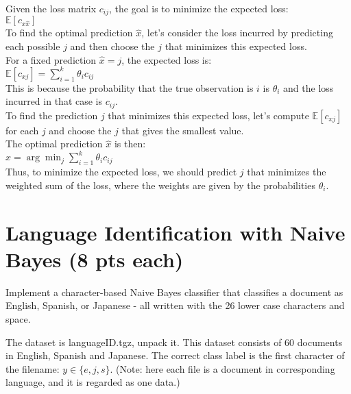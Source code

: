 \documentclass[a4paper]{article}
\theoremstyle{definition}
\newenvironment{soln}{
    \leavevmode\color{blue}\ignorespaces
}{}
\begin{document}
\begin{soln}

Given the loss matrix $c_{ij}$, the goal is to minimize the expected loss:\\

$\mathbb{E}[c_{x\hat{x}}]$\\

To find the optimal prediction $\hat{x}$, let's consider the loss incurred by predicting each possible $j$ and then choose the $j$ that minimizes this expected loss.\\

For a fixed prediction $\hat{x} = j$, the expected loss is:\\

$\mathbb{E}[c_{xj}] = \sum_{i=1}^{k} \theta_i c_{ij}$\\

This is because the probability that the true observation is $i$ is $\theta_i$ and the loss incurred in that case is $c_{ij}$.\\

To find the prediction $j$ that minimizes this expected loss, let's compute $\mathbb{E}[c_{xj}]$ for each $j$ and choose the $j$ that gives the smallest value.\\

The optimal prediction $\hat{x}$ is then:\\

$\hat{x} = \arg\min_{j} \sum_{i=1}^{k} \theta_i c_{ij}$\\

Thus, to minimize the expected loss, we should predict $j$ that minimizes the weighted sum of the loss, where the weights are given by the probabilities $\theta_i$.\\

\end{soln}

\section{Language Identification with Naive Bayes (8 pts each)}
Implement a character-based Naive Bayes classifier that classifies a document as English, Spanish, or Japanese - all written with the 26 lower case characters and space.

The dataset is languageID.tgz, unpack it.
This dataset consists of 60 documents in English, Spanish and Japanese. 
The correct class label is the first character of the filename: $y \in \{e, j, s\}$. (Note: here each file is a document in corresponding language, and it is regarded as one data.)
\end{document}
